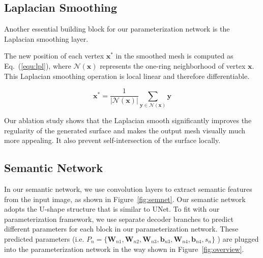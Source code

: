  
\subsection{Laplacian Smoothing}
Another essential building block for our parameterization network is the Laplacian smoothing layer. 
%


The new position of each vertex $\mathbf{x}^{*}$ in the smoothed mesh is computed as Eq.~(\ref{equ:lpl}), where $\mathcal{N}(\mathbf{x})$ represents the one-ring neighborhood of vertex $\mathbf{x}$. 
This Laplacian smoothing operation is local linear and therefore differentiable.

\begin{equation}
\mathbf{x}^* = \frac{1}{|\mathcal{N}(\mathbf{x})|}\sum_{\mathbf{y}\in\mathcal{N}(\mathbf{x})}\mathbf{y}
\label{equ:lpl}
\end{equation}

Our ablation study shows that the Laplacian smooth significantly improves the regularity of the generated surface and makes the output mesh visually much more appealing. It also prevent self-intersection of the surface locally.


\subsection{Semantic Network}
\label{subsec:semnet}
%
In our semantic network, we use convolution layers to extract semantic features from the input image, as shown in Figure~\ref{fig:semnet}.  
Our semantic network adopts the U-shape structure that is similar to UNet\cite{unet}. 
To fit with our parameterization framework, we use separate decoder branches to predict different parameters for each block in our parameterization network. These predicted parameters (i.e. $P_n=\{\mathbf{W}_{n1},\mathbf{W}_{n2},\mathbf{W}_{n3},\mathbf{b}_{n3},\mathbf{W}_{n4},\mathbf{b}_{n4},s_{n}\}$ ) are plugged into the parameterization network in the way shown in Figure~\ref{fig:overview}.

